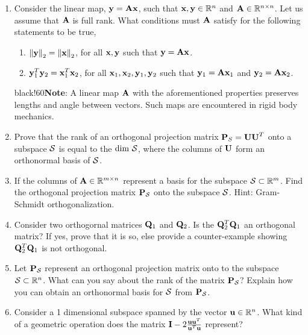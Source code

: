 \documentclass[9pt]{article}
\def\mf{\ensuremath\mathbf}
\def\mb{\ensuremath\mathbb}
\def\mc{\ensuremath\mathcal}
\begin{document}
\begin{multicols}{2}
\begin{enumerate}
    \item Consider the linear map, $\mf{y} = \mf{Ax}$, such that $\mf{x}, \mf{y} \in \mb{R}^n$ and $\mf{A} \in \mb{R}^{n \times n}$. Let us assume that $\mf{A}$ is full rank. What conditions must $\mf{A}$ satisfy for the following statements to be true,
    \begin{enumerate}
        \item $\left\lVert \mf{y}\right\rVert_2 = \left\lVert \mf{x}\right\rVert_2$, for all $\mf{x}, \mf{y}$ such that $\mf{y} = \mf{Ax}$.
        \item $\mf{y}_1^T\mf{y}_2 = \mf{x}_1^T\mf{x}_2$, for all $\mf{x}_1, \mf{x}_2, \mf{y}_1, \mf{y}_2$ such that $\mf{y}_1 = \mf{A}\mf{x}_1$ and $\mf{y}_2 = \mf{A}\mf{x}_2$. 
    \end{enumerate}
    \vspace{-0.1cm}
    \begin{color}{black!60}\small{\textbf{Note}: A linear map $\mf{A}$ with the aforementioned properties preserves lengths and angle between vectors. Such maps are encountered in rigid body mechanics.}
    \end{color}

    \item Prove that the rank of an orthogonal projection matrix $\mf{P}_{S} = \mf{UU}^T$ onto a subspace $\mc{S}$ is equal to the $\text{dim } \mc{S}$, where the columns of $\mf{U}$ form an orthonormal basis of $\mc{S}$.

    \item If the columns of $\mf{A} \in \mb{R}^{m \times n}$ represent a basis for the subspace $\mc{S} \subset \mb{R}^m$. Find the orthogonal projection matrix $\mf{P}_\mc{S}$ onto the subspace $\mc{S}$. Hint: Gram-Schmidt orthogonalization.

    \item Consider two orthogornal matrices $\mf{Q}_1$ and $\mf{Q}_2$. Is the $\mf{Q}_2^T\mf{Q}_1$ an orthogonal matrix? If yes, prove that it is so, else provide a counter-example showing $\mf{Q}_2^T\mf{Q}_1$ is not orthogonal.

    \item Let $\mf{P}_\mc{S}$ represent an orthogonal projection matrix onto to the subspace $\mc{S} \subset \mb{R}^n$. What can you say about the rank of the matrix $\mf{P}_\mc{S}$? Explain how you can obtain an orthonormal basis for $\mc{S}$ from $\mf{P}_\mc{S}$.

    \item Consider a 1 dimensional subspace spanned by the vector $\mf{u} \in \mb{R}^n$. What kind of a geometric operation does the matrix $\mf{I} - 2\frac{\mf{u}\mf{u}^T}{\mf{u}^T\mf{u}}$ represent?


\end{enumerate}
\end{multicols}
\end{document}
